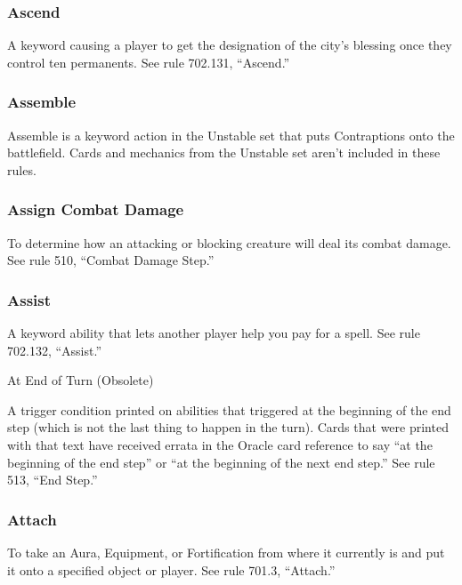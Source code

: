 {\subsubsection*{Ascend}

A keyword causing a player to get the designation of the city’s blessing once they control ten permanents. See rule 702.131, “Ascend.”

\subsubsection*{Assemble}

Assemble is a keyword action in the Unstable set that puts Contraptions onto the battlefield. Cards and mechanics from the Unstable set aren’t included in these rules.

\subsubsection*{Assign Combat Damage}

To determine how an attacking or blocking creature will deal its combat damage. See rule 510, “Combat Damage Step.”

\subsubsection*{Assist}

A keyword ability that lets another player help you pay for a spell. See rule 702.132, “Assist.”

At End of Turn (Obsolete)

A trigger condition printed on abilities that triggered at the beginning of the end step (which is not the last thing to happen in the turn). Cards that were printed with that text have received errata in the Oracle card reference to say “at the beginning of the end step” or “at the beginning of the next end step.” See rule 513, “End Step.”

\subsubsection*{Attach}

To take an Aura, Equipment, or Fortification from where it currently is and put it onto a specified object or player. See rule 701.3, “Attach.”

}
